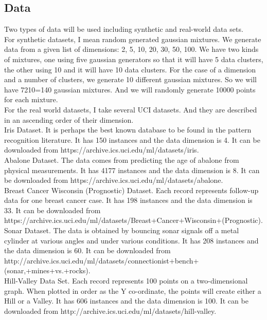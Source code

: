\documentclass[11pt]{article}
\begin{document}
\subsection{Data}
Two types of data will be used including synthetic and real-world data sets.\\
For synthetic datasets, I mean random generated gaussian mixtures. We generate data from a given list of dimensions: 2, 5, 10, 20, 30, 50, 100. We have two kinds of mixtures, one using five gaussian generators so that it will have 5 data clusters, the other using 10 and it will have 10 data clusters. For the case of a dimension and a number of clusters, we generate 10 different gaussian mixtures. So we will have 7210=140 gaussian mixtures. And we will randomly generate 10000 points for each mixture.\\
For the real world datasets, I take several UCI datasets. And they are described in an ascending order of their dimension.\\
Iris Dataset. It is perhaps the best known database to be found in the pattern recognition literature. It has 150 instances and the data dimension is 4. It can be downloaded from https://archive.ics.uci.edu/ml/datasets/iris.\\
Abalone Dataset. The data comes from predicting the age of abalone from physical measurements. It has 4177 instances and the data dimension is 8. It can be downloaded from https://archive.ics.uci.edu/ml/datasets/abalone.\\
Breast Cancer Wisconsin (Prognostic) Dataset. Each record represents follow-up data for one breast cancer case. It has 198 instances and the data dimension is 33. It can be downloaded from https://archive.ics.uci.edu/ml/datasets/Breast+Cancer+Wisconsin+(Prognostic).\\
Sonar Dataset. The data is obtained by bouncing sonar signals off a metal cylinder at various angles and under various conditions. It has 208 instances and the data dimension is 60. It can be downloaded from http://archive.ics.uci.edu/ml/datasets/connectionist+bench+(sonar,+mines+vs.+rocks).\\
Hill-Valley Data Set. Each record represents 100 points on a two-dimensional graph. When plotted in order as the Y co-ordinate, the points will create either a Hill or a Valley. It has 606 instances and the data dimension is 100. It can be downloaded from http://archive.ics.uci.edu/ml/datasets/hill-valley.\\
\end{document}
